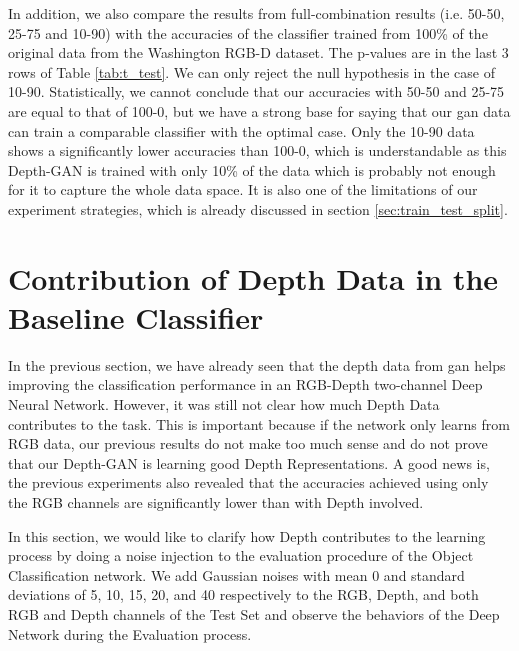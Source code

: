 In addition, we also compare the results from full-combination results (i.e. 50-50, 25-75
and 10-90) with the accuracies of the classifier trained from 100\% of the original data
from the Washington RGB-D dataset. The p-values are in the last 3 rows of Table
\ref{tab:t_test}. We can only reject the null hypothesis in the case of 10-90.
Statistically, we cannot conclude that our accuracies with 50-50 and 25-75 are equal to
that of 100-0, but we have a strong base for saying that our \acrshort{gan} data can train
a comparable classifier with the optimal case. Only the 10-90 data shows a significantly
lower accuracies than 100-0, which is understandable as this Depth-GAN is trained with
only 10\% of the data which is probably not enough for it to capture the whole data
space. It is also one of the limitations of our experiment strategies, which is already
discussed in section \ref{sec:train_test_split}.


\section{Contribution of Depth Data in the Baseline Classifier}
In the previous section, we have already seen that the depth data from \acrshort{gan} helps
improving the classification performance in an RGB-Depth two-channel Deep Neural Network.
However, it was still not clear how much Depth Data contributes to the task. This is
important because if the network only learns from RGB data, our previous results do not
make too much sense and do not prove that our Depth-GAN is learning good Depth
Representations. A good news is, the previous experiments also revealed that the accuracies
achieved using only the RGB channels are significantly lower than with Depth involved. 

In this section, we would like to clarify how Depth contributes to the learning process by
doing a noise injection to the evaluation procedure of the Object Classification network.
We add Gaussian noises with mean 0 and standard deviations of 5, 10, 15, 20, and 40 respectively 
to the RGB, Depth, and both RGB and Depth channels of the Test Set and observe the
behaviors of the Deep Network during the Evaluation process. 

